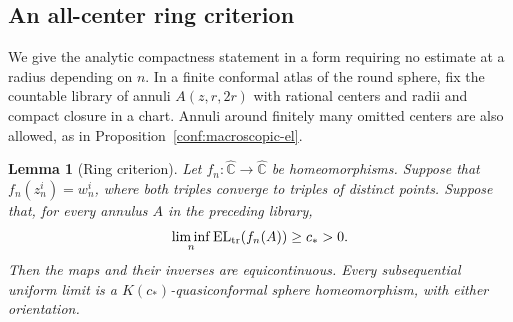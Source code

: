 \documentclass[11pt]{article}
\numberwithin{equation}{section}
\newtheorem{lemma}[theorem]{Lemma}
\theoremstyle{definition}
\theoremstyle{remark}
\newcommand{\1}{\mathbf 1}
\begin{document}
\subsection{An all-center ring criterion}
\label{conf:analytic-subsection}

We give the analytic compactness statement in a form requiring no
estimate at a radius depending on \(n\).  In a finite conformal
atlas of the round sphere, fix the countable library of annuli
\(A(z,r,2r)\) with rational centers and radii and compact closure
in a chart.  Annuli around finitely many omitted centers are also
allowed, as in Proposition~\ref{conf:macroscopic-el}.

\begin{lemma}[Ring criterion]
\label{conf:ring-criterion}
Let \(f_n:\widehat{\mathbb C}\to\widehat{\mathbb C}\) be homeomorphisms.  Suppose that
\(f_n(z_n^i)=w_n^i\), where both triples converge to triples of
distinct points.  Suppose that, for every annulus \(A\) in the
preceding library,
\begin{equation}
 \liminf_n\operatorname{EL}_{\rm tr}(f_n(A))\ge c_*>0.
 \label{conf:ring-hypothesis}
\end{equation}
Then the maps and their inverses are equicontinuous.  Every
subsequential uniform limit is a \(K(c_*)\)-quasiconformal sphere
homeomorphism, with either orientation.
\end{lemma}
\end{document}
